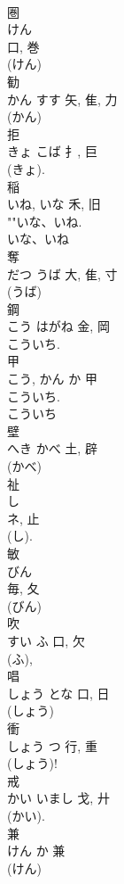 \documentclass[8pt]{extreport}
\begin{document}
\begin{CJK}{UTF8}{min}
\\	圏	
\\	けん	
\\	口, 巻	
\\	(けん) 
\\	勧	
\\	かん	すす	矢, 隹, 力	
\\	(かん) 
\\	拒	
\\	きょ	こば	扌, 巨	
\\	(きょ). 
\\	稲	
\\	いね, いな	禾, 旧		
\\	""いな、いね.
\\	いな、いね 
\\	奪	
\\	だつ	うば	大, 隹, 寸	
\\	(うば) 
\\	鋼	
\\	こう	はがね	金, 岡	
\\	こういち. 
\\	甲	
\\	こう, かん	か	甲	
\\	こういち.	
\\	こういち 
\\	壁	
\\	へき	かべ	土, 辟	
\\	(かべ) 
\\	祉	
\\	し	
\\	ネ, 止	
\\	(し). 
\\	敏	
\\	びん	
\\	毎, 夂	
\\	(びん) 
\\	吹	
\\	すい	ふ	口, 欠	
\\	(ふ), 
\\	唱	
\\	しょう	とな	口, 日	
\\	(しょう) 
\\	衝	
\\	しょう	つ	行, 重	
\\	(しょう)! 
\\	戒	
\\	かい	いまし	戈, 廾	
\\	(かい).	
\\	兼	
\\	けん	か	兼	
\\	(けん) 

\end{CJK}
\end{document}
